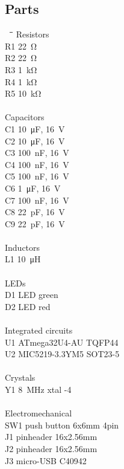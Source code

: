 \begin{multicols}{2}
\section{Parts}
\begin{tabbing}
~~\=\hspace*{15mm}\=\hspace*{35mm}\=  \kill
Resistors \+\\
  R1 \> \SI{22}{\ohm}  \\
  R2 \> \SI{22}{\ohm}  \\
  R3 \> \SI{1}{\kilo\ohm}  \\
  R4 \> \SI{1}{\kilo\ohm}  \\
  R5 \> \SI{10}{\kilo\ohm}  \\
  \-\\
Capacitors \+\\
  C1 \> \SI{10}{\micro\farad}, \SI{16}{\volt}  \\
  C2 \> \SI{10}{\micro\farad}, \SI{16}{\volt}  \\
  C3 \> \SI{100}{\nano\farad}, \SI{16}{\volt}  \\
  C4 \> \SI{100}{\nano\farad}, \SI{16}{\volt}  \\
  C5 \> \SI{100}{\nano\farad}, \SI{16}{\volt}  \\
  C6 \> \SI{1}{\micro\farad}, \SI{16}{\volt}  \\
  C7 \> \SI{100}{\nano\farad}, \SI{16}{\volt}  \\
  C8 \> \SI{22}{\pico\farad}, \SI{16}{\volt}  \\
  C9 \> \SI{22}{\pico\farad}, \SI{16}{\volt}  \\
  \-\\
Inductors  \+\\
  L1 \> \SI{10}{\micro\henry}  \\
  \-\\
LEDs  \+\\
  D1 \> LED green  \\
  D2 \> LED red  \\
  \-\\
Integrated circuits \+\\
  U1 \> ATmega32U4-AU \> TQFP44\\
  U2 \> MIC5219-3.3YM5 \> SOT23-5\\
  \-\\
Crystals\+\\
  Y1 \> \SI{8}{\mega\hertz} xtal -4\\
  \-\\
Electromechanical\+\\
  SW1 \> push button \> 6x6mm 4pin\\
  J1 \> pinheader \> 16x2.56mm\\
  J2 \> pinheader \> 16x2.56mm\\
  J3 \> micro-USB \> C40942\\
\end{tabbing}



\end{multicols}
